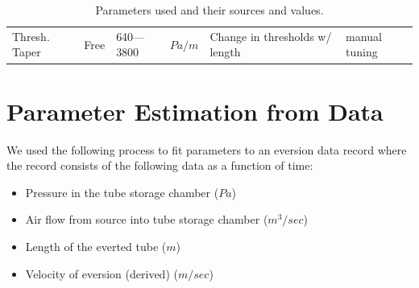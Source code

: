 \documentclass[letterpaper]{article}
\begin{document}
\begin{table}
\begin{tabular}{l|l|l|l|p{1.35in}|l}
Thresh. Taper & Free     &  640---3800  &  $Pa/m$      & Change in thresholds w/ length   & manual tuning\\
\end{tabular}
\caption{Parameters used and their sources and values. }\label{Tab:paramClass}
\end{table}
%
%


\section{Parameter Estimation from Data}

We used the following process  to fit parameters to an eversion data
record where the record consists of the following data as a function of time:

\begin{itemize}
    \item Pressure in the tube storage chamber ($Pa$)
    \item Air flow from source into tube storage chamber ($m^3/sec$)
    \item Length of the everted tube ($m$)
    \item Velocity of eversion (derived) ($m/sec$)
\end{itemize}
\end{document}
